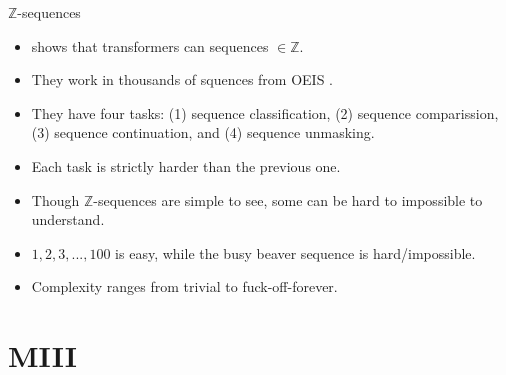 \documentclass[aspectratio=32]{beamer}
\providecommand{\tightlist}{\setlength{\itemsep}{0pt}\setlength{\parskip}{0pt}}
\begin{document}
  \begin{frame}[allowframebreaks]{\textbar{} \(\mathbb{Z}\)-sequences}
  \begin{itemize}
  \tightlist
  \item
    \textcite{belcak2022} shows that transformers can sequences
    \(\in\mathbb{Z}\).
  \item
    They work in thousands of squences from OEIS \autocite{sloane2003}.
  \item
    They have four tasks: (1) sequence classification, (2) sequence
    comparission, (3) sequence continuation, and (4) sequence unmasking.
  \item
    Each task is strictly harder than the previous one.
  \end{itemize}

  \framebreak

  \begin{itemize}
  \tightlist
  \item
    Though \(\mathbb{Z}\)-sequences are simple to see, some can be hard
    to impossible to understand.
  \item
    \(1, 2, 3, ..., 100\) is easy, while the busy beaver sequence
    \autocite{aaronson2020} is hard/impossible.
  \item
    Complexity ranges from trivial to fuck-off-forever.
  \end{itemize}
  \end{frame}

  \section{\textbar{} MIII}\label{miii}
\end{document}
